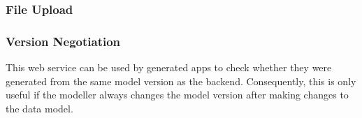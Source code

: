 \subsubsection{File Upload} 

\subsubsection{Version Negotiation} 
This web service can be used by generated apps to check whether they were generated from the same model version as the backend. Consequently, this is only useful if the modeller always changes the model version after making changes to the data model.